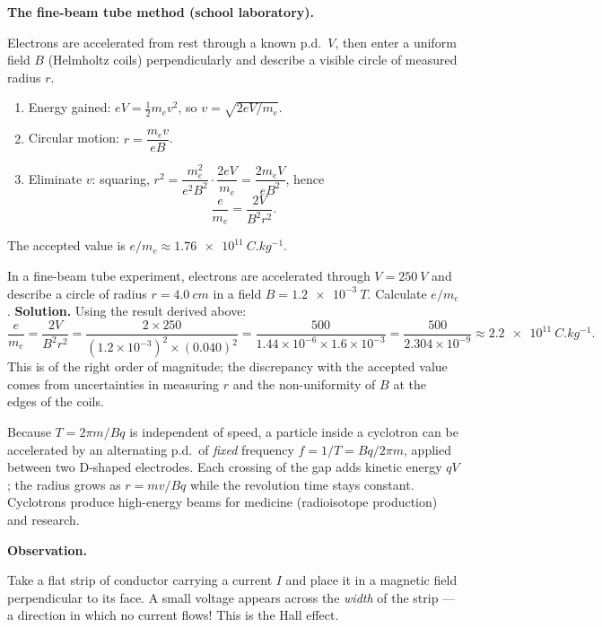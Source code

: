 \documentclass[11pt]{article}
\newcommand{\cle}[1]{{\popxbold\color{popdark}#1}}
\newcounter{popsec}
\newcounter{popsub}
\newcommand{\courssub}[1]{%
  \stepcounter{popsub}%
  \par\vspace{9pt}\noindent{\popxbold\fontsize{11.5}{13}\selectfont\color{popink}{\color{poporange}\thepopsec.\thepopsub}\hspace{6pt}#1}\par\nopagebreak\vspace{4pt}
}
\begin{document}
\textbf{The fine-beam tube method (school laboratory).}\par
Electrons are accelerated from rest through a known p.d.\ $V$, then enter a uniform field $B$ (Helmholtz coils) perpendicularly and describe a visible circle of measured radius $r$.
\begin{enumerate}
\item Energy gained: $eV = \tfrac{1}{2}m_ev^{2}$, so $v = \sqrt{2eV/m_e}$.
\item Circular motion: $r = \dfrac{m_ev}{eB}$.
\item Eliminate $v$: squaring, $r^{2} = \dfrac{m_e^{2}}{e^{2}B^{2}}\cdot\dfrac{2eV}{m_e} = \dfrac{2m_eV}{eB^{2}}$, hence
\[ \frac{e}{m_e} = \frac{2V}{B^{2}r^{2}}. \]
\end{enumerate}
The accepted value is $e/m_e \approx \SI{1.76e11}{C.kg^{-1}}$.

\begin{exoresolu}
In a fine-beam tube experiment, electrons are accelerated through $V = \SI{250}{V}$ and describe a circle of radius $r = \SI{4.0}{cm}$ in a field $B = \SI{1.2e-3}{T}$. Calculate $e/m_e$.
\tcblower
\textbf{Solution.} Using the result derived above:
\[ \frac{e}{m_e} = \frac{2V}{B^{2}r^{2}} = \frac{2\times 250}{(1.2\times10^{-3})^{2}\times(0.040)^{2}} = \frac{500}{1.44\times10^{-6}\times 1.6\times10^{-3}} = \frac{500}{2.304\times10^{-9}} \approx \SI{2.2e11}{C.kg^{-1}}. \]
This is of the right order of magnitude; the discrepancy with the accepted value comes from uncertainties in measuring $r$ and the non-uniformity of $B$ at the edges of the coils.
\end{exoresolu}

\begin{savaistu}
Because $T = 2\pi m/Bq$ is independent of speed, a particle inside a cyclotron can be accelerated by an alternating p.d.\ of \emph{fixed} frequency $f = 1/T = Bq/2\pi m$, applied between two D-shaped electrodes. Each crossing of the gap adds kinetic energy $qV$; the radius grows as $r = mv/Bq$ while the revolution time stays constant. Cyclotrons produce high-energy beams for medicine (radioisotope production) and research.
\end{savaistu}

\courssub{The Hall Effect}

\textbf{Observation.}\par
Take a flat strip of conductor carrying a current $I$ and place it in a magnetic field perpendicular to its face. A small voltage appears across the \emph{width} of the strip — a direction in which no current flows! This is the \cle{Hall effect}.
\end{document}
